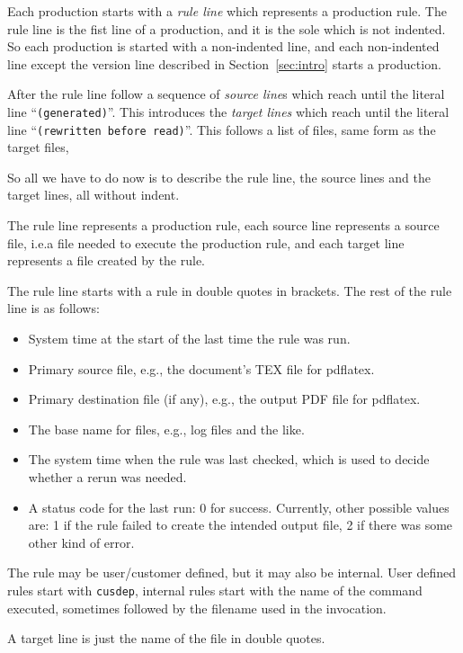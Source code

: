 \documentclass[a4paper, english]{article}%
\begin{document}
Each production starts with a \emph{rule line} which represents a production rule. 
The rule line is the fist line of a production, and it is the sole which is not indented.  
So each production is started with a non-indented line, 
and each non-indented line except the version line described in Section~\ref{sec:intro} starts a production. 

After the rule line follow a sequence of \emph{source line}s 
which reach until the literal line ``\texttt{(generated)}''. 
This introduces the \emph{target lines} 
which reach until the literal line ``\texttt{(rewritten before read)}''. 
This follows a list of files, same form as the target files, 

So all we have to do now is to describe the rule line, 
the source lines and the target lines, all without indent. 

The rule line represents a production rule, 
each source line represents a source file, 
i.e.\@ a file needed to execute the production rule, 
and each target line represents a file created by the rule. 

The rule line starts with a rule in double quotes in brackets. 
The rest of the rule line is as follows: 
%
\begin{itemize}
  \item 
  System time at the start of the last time the rule was run.
  \item 
  Primary source file, e.g., the document's TEX file for pdflatex.
  \item 
  Primary destination file (if any), e.g., the output PDF file for pdflatex.
  \item 
  The base name for files, e.g., log files and the like.
  \item 
  The system time when the rule was last checked, 
  which is used to decide whether a rerun was needed.
  \item
  A status code for the last run: 0 for success. Currently, other possible values are: 1 if the rule failed to create the intended output file, 2 if there was some other kind of error.

\end{itemize}

The rule may be user/customer defined, but it may also be internal. 
User defined rules start with \texttt{cusdep}, 
internal rules start with the name of the command executed, 
sometimes followed by the filename used in the invocation. 

A target line is just the name of the file in double quotes. 
\end{document}
